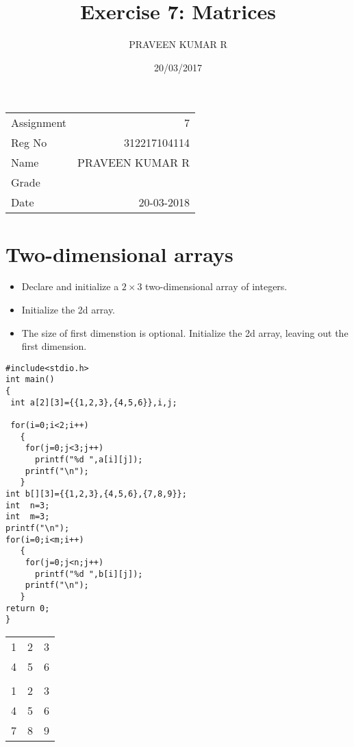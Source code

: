 \documentclass[11pt]{article}
\author{PRAVEEN KUMAR R}
\date{20/03/2017}
\title{Exercise 7: Matrices}
\begin{document}
\maketitle
\linespread{1.2}
\begin{center}
\begin{tabular}{lr}
Assignment & 7\\
Reg No & 312217104114\\
Name & PRAVEEN KUMAR R\\
Grade & \\
Date & 20-03-2018\\
\end{tabular}
\end{center}

\section{Two-dimensional arrays}
\label{sec-1}
\begin{itemize}
\item Declare and initialize a $2 \times 3$ two-dimensional
array of integers.
\end{itemize}
\linespread{1}
\begin{itemize}
\item Initialize the 2d array.
\end{itemize}
\linespread{1.2}
\begin{itemize}
\item The size of first dimenstion is optional. Initialize the
2d array, leaving out the first dimension.
\end{itemize}
\linespread{1}
\linespread{1.2}
\begin{verbatim}
#include<stdio.h>
int main()
{
 int a[2][3]={{1,2,3},{4,5,6}},i,j;

 for(i=0;i<2;i++)
   {
    for(j=0;j<3;j++)
      printf("%d ",a[i][j]);
    printf("\n");
   }
int b[][3]={{1,2,3},{4,5,6},{7,8,9}};
int  n=3;
int  m=3;
printf("\n");
for(i=0;i<m;i++)
   {
    for(j=0;j<n;j++)
      printf("%d ",b[i][j]);
    printf("\n");
   }
return 0;
}
\end{verbatim}

\begin{center}
\begin{tabular}{rrr}
1 & 2 & 3\\
4 & 5 & 6\\
 &  & \\
1 & 2 & 3\\
4 & 5 & 6\\
7 & 8 & 9\\
\end{tabular}
\end{center}
\end{document}
